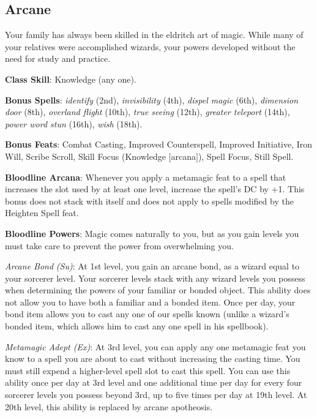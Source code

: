 \subsection{Arcane}

				
Your family has always been skilled in the eldritch art of magic. While many of your relatives were accomplished wizards, your 
powers developed without the need for study and practice.
				
\textbf{Class Skill}: Knowledge (any one).
				
\textbf{Bonus Spells}: \textit{identify} (2nd), \textit{invisibility} (4th), \textit{dispel magic} (6th), \textit{dimension door }(8th),
\textit{overland flight }(10th), \textit{true seeing} (12th), \textit{greater teleport} (14th), \textit{power word stun} (16th), 
\textit{wish} (18th).
				
\textbf{Bonus Feats}: Combat Casting, Improved Counterspell, Improved Initiative, Iron Will, Scribe Scroll,
Skill Focus (Knowledge \mbox{$[$}arcana\mbox{$]$}), Spell Focus, Still Spell.
				
\textbf{Bloodline Arcana}: Whenever you apply a metamagic feat to a spell that increases the slot used by at least one level, increase
the spell's DC by +1. This bonus does not stack with itself and does not apply to spells modified by the Heighten Spell feat.
				
\textbf{Bloodline Powers}: Magic comes naturally to you, but as you gain levels you must take care to prevent the power from
overwhelming you. 
				
\textit{Arcane Bond} \textit{(Su)}: At 1st level, you gain an arcane bond, as a wizard equal to your sorcerer level. Your sorcerer
levels stack with any wizard levels you possess when determining the powers of your familiar or bonded object. This ability does 
not allow you to have both a familiar and a bonded item. Once per day, your bond item allows you to cast any one of our spells known 
(unlike a wizard's bonded item, which allows him to cast any one spell in his spellbook).
				
\textit{Metamagic Adept (Ex)}: At 3rd level, you can apply any one metamagic feat you know to a spell you are about to cast without
increasing the casting time. You must still expend a higher-level spell slot to cast this spell. You can use this ability once per 
day at 3rd level and one additional time per day for every four sorcerer levels you possess beyond 3rd, up to five times per day at
19th level. At 20th level, this ability is replaced by arcane apotheosis.
				
